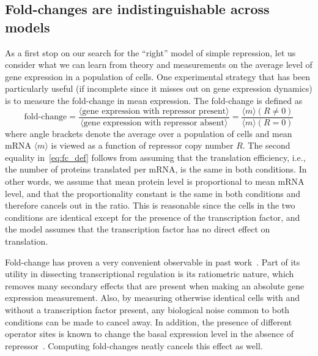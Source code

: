 \subsection{Fold-changes are indistinguishable across models}
As a first stop on our search for the ``right'' model of simple repression, let
us consider what we can learn from theory and measurements on the
average level of  gene expression in a population of cells.
One experimental strategy that has been particularly useful (if incomplete since
it misses out on gene expression dynamics) is to measure the  fold-change in
mean expression. The fold-change is defined as
\begin{equation}
\text{fold-change}
= \frac{\langle \text{gene expression with repressor present} \rangle}
        {\langle \text{gene expression with repressor absent} \rangle}
= \frac{\langle m\rangle(R\ne 0)}{\langle m\rangle(R = 0)}
\label{eq:fc_def}
\end{equation}
where angle brackets denote the average over a population of cells and mean mRNA
$\langle m\rangle$ is viewed as a function of repressor copy number $R$. The
second equality in~\ref{eq:fc_def} follows from assuming that the translation
efficiency, i.e., the number of proteins translated per mRNA, is the same in
both conditions. In other words, we assume that mean protein level is
proportional to mean mRNA level, and that the proportionality constant is the
same in both conditions and therefore cancels out in the ratio. This is
reasonable since the cells in the two conditions are identical except for the
presence of the transcription factor, and the model assumes that the 
transcription factor has no direct effect on translation.

Fold-change has proven a very convenient observable in past
work~\cite{Garcia2011a, Razo-Mejia2018, Chure2019}. Part of its utility in
dissecting transcriptional regulation is its ratiometric nature, which removes many
secondary effects that are present when making an absolute gene
expression measurement.   Also, by measuring otherwise
identical cells with and without a transcription factor present, any biological
noise common to both conditions can be made to cancel away. In addition, the
presence of different operator sites is known to change the basal expression
level in the absence of repressor~. Computing fold-changes
neatly cancels this effect as well.

